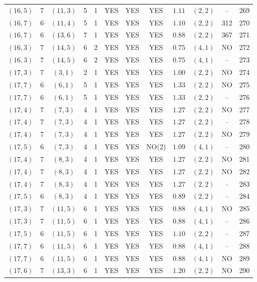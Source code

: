 \begin{longtable}{|c|c|c|c|c|c|c|c|c|c|c|c|}
$(16,5)$ & 7 & $(11,3)$ & 5 & 1 & YES & YES & YES & $1.11$ & $(2,2)$ & -- & 269\\
$(16,7)$ & 6 & $(11,4)$ & 5 & 1 & YES & YES & YES & $1.10$ & $(2,2)$ & 312 & 270\\
$(16,7)$ & 6 & $(13,6)$ & 7 & 1 & YES & YES & YES & $0.88$ & $(2,2)$ & 367 & 271\\
$(16,3)$ & 7 & $(14,5)$ & 6 & 2 & YES & YES & YES & $0.75$ & $(4,1)$ & NO & 272\\
$(16,3)$ & 7 & $(14,5)$ & 6 & 2 & YES & YES & YES & $0.75$ & $(4,1)$ & -- & 273\\
$(17,3)$ & 7 & $(3,1)$ & 2 & 1 & YES & YES & YES & $1.00$ & $(2,2)$ & NO & 274\\
$(17,7)$ & 6 & $(6,1)$ & 5 & 1 & YES & YES & YES & $1.33$ & $(2,2)$ & NO & 275\\
$(17,7)$ & 6 & $(6,1)$ & 5 & 1 & YES & YES & YES & $1.33$ & $(2,2)$ & -- & 276\\
$(17,4)$ & 7 & $(7,3)$ & 4 & 1 & YES & YES & YES & $1.27$ & $(2,2)$ & NO & 277\\
$(17,4)$ & 7 & $(7,3)$ & 4 & 1 & YES & YES & YES & $1.27$ & $(2,2)$ & -- & 278\\
$(17,4)$ & 7 & $(7,3)$ & 4 & 1 & YES & YES & YES & $1.27$ & $(2,2)$ & NO & 279\\
$(17,5)$ & 6 & $(7,3)$ & 4 & 1 & YES & YES & NO(2) & $1.09$ & $(4,1)$ & -- & 280\\
$(17,4)$ & 7 & $(8,3)$ & 4 & 1 & YES & YES & YES & $1.27$ & $(2,2)$ & NO & 281\\
$(17,4)$ & 7 & $(8,3)$ & 4 & 1 & YES & YES & YES & $1.27$ & $(2,2)$ & NO & 282\\
$(17,4)$ & 7 & $(8,3)$ & 4 & 1 & YES & YES & YES & $1.27$ & $(2,2)$ & -- & 283\\
$(17,5)$ & 6 & $(8,3)$ & 4 & 1 & YES & YES & YES & $0.89$ & $(2,2)$ & -- & 284\\
$(17,3)$ & 7 & $(11,5)$ & 6 & 1 & YES & YES & YES & $0.88$ & $(4,1)$ & NO & 285\\
$(17,3)$ & 7 & $(11,5)$ & 6 & 1 & YES & YES & YES & $0.88$ & $(4,1)$ & -- & 286\\
$(17,5)$ & 6 & $(11,5)$ & 6 & 1 & YES & YES & YES & $1.10$ & $(2,2)$ & -- & 287\\
$(17,7)$ & 6 & $(11,5)$ & 6 & 1 & YES & YES & YES & $0.88$ & $(4,1)$ & -- & 288\\
$(17,7)$ & 6 & $(11,5)$ & 6 & 1 & YES & YES & YES & $0.88$ & $(4,1)$ & NO & 289\\
$(17,6)$ & 7 & $(13,3)$ & 6 & 1 & YES & YES & YES & $1.20$ & $(2,2)$ & NO & 290\\

\end{longtable}
